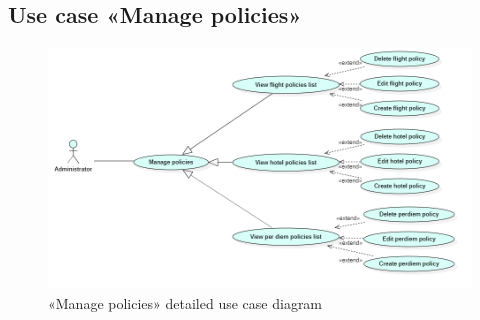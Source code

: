     
    
    
    
    
    
\subsection*{Use case «Manage policies»}
\begin{figure}[H]
    \begin{center}
        \includegraphics[scale=0.50]{img/sprint1_policy_usecase.png}
         \caption{«Manage policies» detailed use case diagram}
    \end{center}   
    \end{figure}
    

